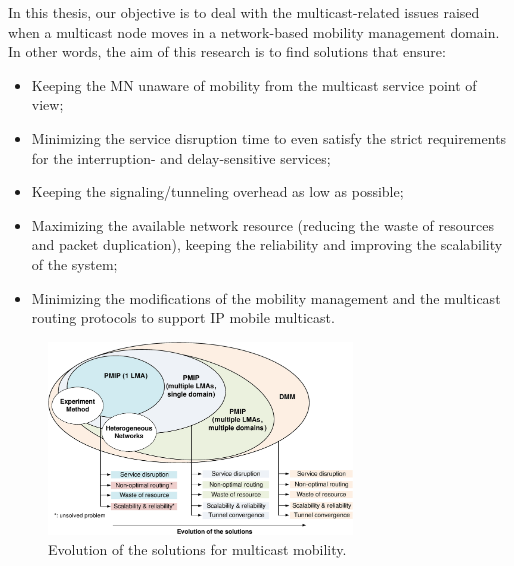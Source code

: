 In this thesis, our objective is to deal with the multicast-related issues raised when a multicast node moves in a network-based mobility management domain. In other words, the aim of this research is to find solutions that ensure:
\begin{itemize}
\item Keeping the MN unaware of mobility from the multicast service point of view;
\item Minimizing the service disruption time to even satisfy the strict requirements for the interruption- and delay-sensitive services;
\item Keeping the signaling/tunneling overhead as low as possible;
\item Maximizing the available network resource (reducing the waste of resources and packet duplication), keeping the reliability and improving the scalability of the system;
\item Minimizing the modifications of the mobility management and the multicast routing protocols to support IP mobile multicast. 
\end{itemize}
\begin{figure}[h!] 
 \begin{center} 
 \includegraphics[width=0.72\textwidth]{./Introduction/Chapter1/figures/vision.eps} 
    \caption{Evolution of the solutions for multicast mobility.}
     \label{fig:vision}
  \end{center} 
\end{figure}
